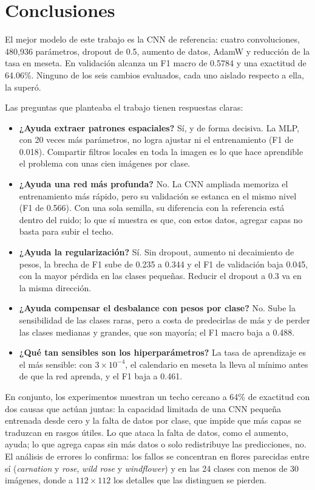\section{Conclusiones}
\label{sec:conclusiones}

El mejor modelo de este trabajo es la CNN de referencia: cuatro convoluciones,
480,936 parámetros, dropout de 0.5, aumento de datos, AdamW y reducción de la
tasa en meseta. En validación alcanza un F1 macro de 0.5784 y una exactitud de
64.06\%. Ninguno de los seis cambios evaluados, cada uno aislado respecto a ella,
la superó.

Las preguntas que planteaba el trabajo tienen respuestas claras:

\begin{itemize}
	\item \textbf{¿Ayuda extraer patrones espaciales?} Sí, y de forma decisiva. La
	      MLP, con 20 veces más parámetros, no logra ajustar ni el entrenamiento (F1 de
	      0.018). Compartir filtros locales en toda la imagen es lo que hace aprendible el
	      problema con unas cien imágenes por clase.
	\item \textbf{¿Ayuda una red más profunda?} No. La CNN ampliada memoriza el
	      entrenamiento más rápido, pero su validación se estanca en el mismo nivel (F1
	      de 0.566). Con una sola semilla, su diferencia con la referencia está dentro del
	      ruido; lo que sí muestra es que, con estos datos, agregar capas no basta para subir
	      el techo.
	\item \textbf{¿Ayuda la regularización?} Sí. Sin dropout, aumento ni
	      decaimiento de pesos, la brecha de F1 sube de 0.235 a 0.344 y el F1 de
	      validación baja 0.045, con la mayor pérdida en las clases pequeñas. Reducir el
	      dropout a 0.3 va en la misma dirección.
	\item \textbf{¿Ayuda compensar el desbalance con pesos por clase?} No. Sube la
	      sensibilidad de las clases raras, pero a costa de predecirlas de más y de
	      perder las clases medianas y grandes, que son mayoría; el F1 macro baja a
	      0.488.
	\item \textbf{¿Qué tan sensibles son los hiperparámetros?} La tasa de
	      aprendizaje es el más sensible: con $3\times10^{-4}$, el calendario en meseta la
	      lleva al mínimo antes de que la red aprenda, y el F1 baja a 0.461.
\end{itemize}

En conjunto, los experimentos muestran un techo cercano a 64\% de exactitud con
dos causas que actúan juntas: la capacidad limitada de una CNN pequeña entrenada
desde cero y la falta de datos por clase, que impide que más capas se traduzcan
en rasgos útiles. Lo que ataca la falta de datos, como el aumento, ayuda; lo que
agrega capas sin más datos o solo redistribuye las predicciones, no. El análisis de
errores lo confirma: los fallos se concentran en flores parecidas entre sí
(\emph{carnation} y \emph{rose}, \emph{wild rose} y \emph{windflower}) y en las
24 clases con menos de 30 imágenes, donde a $112\times112$ los detalles que las
distinguen se pierden.

